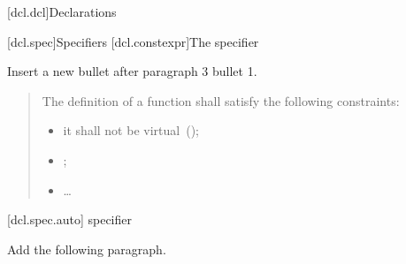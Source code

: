 
\setcounter{chapter}{6}
[dcl.dcl]{Declarations}

[dcl.spec]{Specifiers}
\setcounter{section}{1}
\setcounter{subsection}{4}
[dcl.constexpr]{The  specifier}%

Insert a new bullet after paragraph 3 bullet 1.


\begin{quote}
  \setcounter{Paras}{2}
\pnum
{}
The definition of a  function shall satisfy the following
constraints:

\begin{itemize}
  \item it shall not be virtual~();
  \item {};
  \item \ldots
\end{itemize}
\end{quote}

%
%  
%      

\setcounter{section}{1}
\setcounter{subsection}{6}
\setcounter{subsubsection}{3}
[dcl.spec.auto]{ specifier}

Add the following paragraph.

